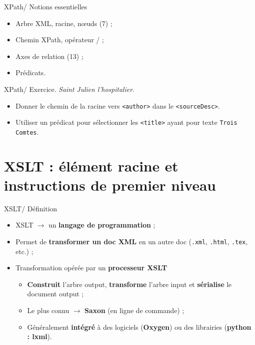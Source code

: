 \documentclass{beamer}
\begin{document}
    \begin{frame}{XPath/ Notions essentielles}
        \Large
        \begin{itemize}
            \item Arbre XML, racine, n\oe uds (7) ;
            \item Chemin XPath, opérateur / ;
            \item Axes de relation (13) ;
            \item Prédicats.
        \end{itemize}
    \end{frame}

    \begin{frame}{XPath/ Exercice. \textit{Saint Julien l'hospitalier}.}
        \Large
        \begin{itemize}
            \item Donner le chemin de la racine vers \texttt{<author>} dans le \texttt{<sourceDesc>}.
            \bigskip
            \item Utiliser un prédicat pour sélectionner les \texttt{<title>} ayant pour texte \texttt{Trois Comtes}.
        \end{itemize}
    \end{frame}

    \section{XSLT : élément racine et instructions de premier niveau}

    \begin{frame}{XSLT/ Définition}
        \Large
        \begin{itemize}
            \item XSLT $\rightarrow$ un \textbf{langage de programmation} ;
            \bigskip
            \item Permet de \textbf{transformer un doc XML} en un autre doc  (\texttt{.xml}, \texttt{.html}, \texttt{.tex}, etc.) ;
            \bigskip
            \item Transformation opérée par un \textbf{processeur XSLT}
            \begin{itemize}
                \item \textbf{Construit} l'arbre output, \textbf{transforme} l'arbre input et \textbf{sérialise} le document output ;
                \item Le plus connu $\rightarrow$ \textbf{Saxon} (en ligne de commande) ;
                \item Généralement \textbf{intégré} à des logiciels (\textbf{Oxygen}) ou des librairies (\textbf{python : lxml}).
            \end{itemize}
        \end{itemize}
    \end{frame}
\end{document}
